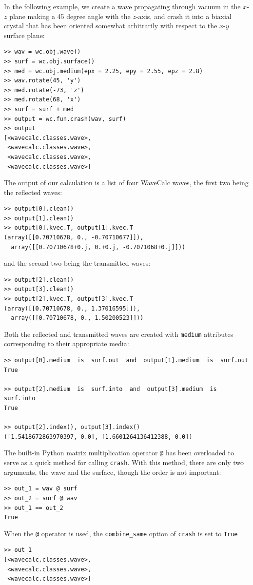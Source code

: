 \documentclass[11pt, reqno]{book}%
\newcounter{ct}
\newcommand{\tw}[1]{{\tt #1}}
\begin{document}
In the following example, we create a wave propagating through vacuum in the $x$-$z$ plane making a 45 degree angle with the $z$-axis, and crash it into a biaxial crystal that has been oriented somewhat arbitrarily with respect to the $x$-$y$ surface plane:
\begin{verbatim}
>> wav = wc.obj.wave()
>> surf = wc.obj.surface()
>> med = wc.obj.medium(epx = 2.25, epy = 2.55, epz = 2.8)
>> wav.rotate(45, 'y')
>> med.rotate(-73, 'z')
>> med.rotate(68, 'x')
>> surf = surf + med
>> output = wc.fun.crash(wav, surf)
>> output
[<wavecalc.classes.wave>, 
 <wavecalc.classes.wave>, 
 <wavecalc.classes.wave>, 
 <wavecalc.classes.wave>]
\end{verbatim}
\noindent The output of our calculation is a list of four WaveCalc waves, the first two being the reflected waves:
\begin{verbatim}
>> output[0].clean()
>> output[1].clean()
>> output[0].kvec.T, output[1].kvec.T
(array([[0.70710678, 0., -0.70710677]]), 
  array([[0.70710678+0.j, 0.+0.j, -0.7071068+0.j]]))
\end{verbatim}
\noindent and the second two being the transmitted waves:
\begin{verbatim}
>> output[2].clean()
>> output[3].clean()
>> output[2].kvec.T, output[3].kvec.T
(array([[0.70710678, 0., 1.37016595]]),
  array([[0.70710678, 0., 1.50200523]]))
\end{verbatim}
\noindent Both the reflected and transmitted waves are created with \tw{medium} attributes corresponding to their appropriate media:
\begin{verbatim}
>> output[0].medium  is  surf.out  and  output[1].medium  is  surf.out
True

>> output[2].medium  is  surf.into  and  output[3].medium  is  surf.into
True

>> output[2].index(), output[3].index()
([1.5418672863970397, 0.0], [1.6601264136412388, 0.0])
\end{verbatim}

The built-in Python matrix multiplication operator \tw{@} has been overloaded to serve as a quick method for calling \tw{crash}. With this method, there are only two arguments, the wave and the surface, though the order is not important:
\begin{verbatim}
>> out_1 = wav @ surf
>> out_2 = surf @ wav
>> out_1 == out_2
True
\end{verbatim}
\noindent When the \tw{@} operator is used, the \tw{combine\_same} option of \tw{crash} is set to \tw{True}
\begin{verbatim}
>> out_1
[<wavecalc.classes.wave>, 
 <wavecalc.classes.wave>, 
 <wavecalc.classes.wave>]
\end{verbatim}
\end{document}
